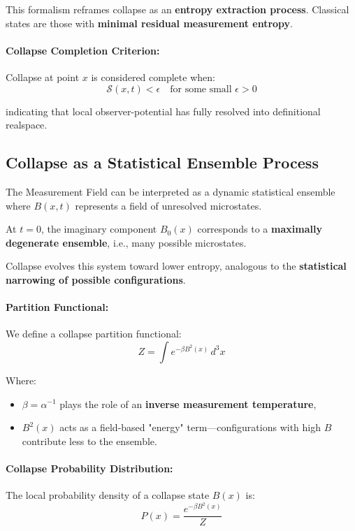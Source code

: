 This formalism reframes collapse as an \textbf{entropy extraction process}. \cite{imaginary_meta} Classical states are those with \textbf{minimal residual measurement entropy}. \cite{imaginary_meta} 

\paragraph{Collapse Completion Criterion:}
Collapse at point $x$ is considered complete when:
\[
\mathcal{S}(x, t) < \epsilon
\quad \text{for some small } \epsilon > 0
\]

indicating that local observer-potential has fully resolved into definitional realspace. \cite{imaginary_meta} 

\subsection*{Collapse as a Statistical Ensemble Process}

The Measurement Field can be interpreted as a dynamic statistical ensemble where $B(x, t)$ represents a field of unresolved microstates. \cite{imaginary_meta} 

At $t = 0$, the imaginary component $B_0(x)$ corresponds to a \textbf{maximally degenerate ensemble}, i.e., many possible microstates. 

Collapse evolves this system toward lower entropy, analogous to the \textbf{statistical narrowing of possible configurations}. \cite{imaginary_meta} 

\paragraph{Partition Functional:}
We define a collapse partition functional:
\[
Z = \int e^{-\beta B^2(x)} \, d^3x
\]

Where:
\begin{itemize}
  \item $\beta = \alpha^{-1}$ plays the role of an \textbf{inverse measurement temperature},
  \item $B^2(x)$ acts as a field-based "energy" term---configurations with high $B$ contribute less to the ensemble. \cite{imaginary_meta} 
\end{itemize}

\paragraph{Collapse Probability Distribution:}
The local probability density of a collapse state $B(x)$ is:
\[
P(x) = \frac{e^{-\beta B^2(x)}}{Z}
\]

